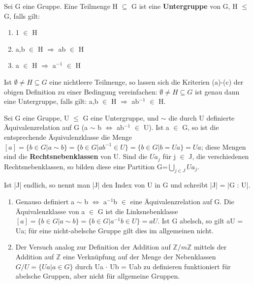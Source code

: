 \begin{definition}
Sei G eine Gruppe. Eine Teilmenge H $\subseteq$ G ist eine \textbf{Untergruppe} von G, H $\le$ G, falls gilt:
\begin{enumerate}
\item 1 $\in$ H
\item a,b $\in$ H $\Rightarrow$ ab $\in$ H
\item a $\in$ H $\Rightarrow$ a$^{-1}$ $\in$ H
\end{enumerate}
\end{definition}

\begin{remark} 
Ist $\emptyset \neq H \subseteq G$ eine nichtleere Teilmenge, so lassen sich die Kriterien (a)-(c) der obigen Definition zu einer Bedingung vereinfachen: 
$\emptyset \neq H \subseteq G$ ist genau dann eine Untergruppe, falls gilt: a,b $\in$ H $\Rightarrow$ ab$^{-1}$ $\in$ H.
\end{remark}

\begin{definition}
Sei G eine Gruppe, U $\le$ G eine Untergruppe, und $\sim$ die durch U definierte Äquivalenzrelation auf G (a $\sim$ b $\Leftrightarrow$ ab$^{-1}$ $\in$ U). Ist a $\in$ G, so ist die entsprechende Äquivalenzklasse die Menge 
$[a]=\{ b \in G | a \sim b \} = \{ b \in G | ab^{-1} \in U \} = \{ b \in G | b = Ua \} = Ua$; 
diese Mengen sind die \textbf{Rechtsnebenklassen} von U. Sind die $Ua_j$ für j $\in$ J, die verschiedenen Rechtsnebenklassen, so bilden diese eine Partition G=$\bigcup\limits_{j \in J} Ua_j$.
\end{definition}

\begin{remark}
Ist |J| endlich, so nennt man |J| den Index von U in G und schreibt |J| = |G : U|.
\begin{enumerate}
\item Genauso definiert a $\sim$ b $\Leftrightarrow$ a$^{-1}$b $\in$ eine Äquivalenzrelation auf G. Die Äquivalenzklasse von a $\in$ G ist die Linksnebenklasse $[a] = \{b \in G | a \sim b \} = \{ b \in G | a^{-1}b \in U \} = aU$. 
Ist G abelsch, so gilt aU = Ua; für eine nicht-abelsche Gruppe gilt dies im allgemeinen nicht.
\item Der Versuch analog zur Definition der Addition auf $\mathbb{Z}/m\mathbb{Z}$ mittels der Addition auf $\mathbb{Z}$ eine Verknüpfung auf der Menge der Nebenklassen $G/U = \{Ua | a \in G\}$ durch Ua $\cdot$ Ub = Uab zu definieren funktioniert für abelsche Gruppen, aber nicht für allgemeine Gruppen.
\end{enumerate}
\end{remark}

